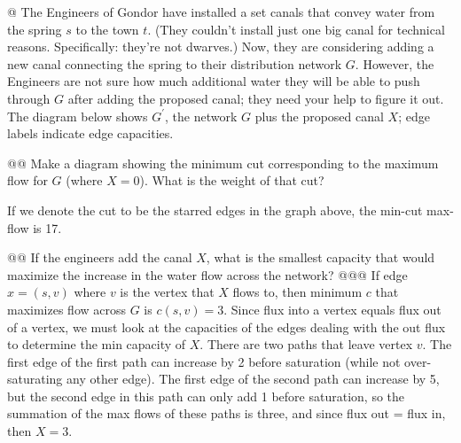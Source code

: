\documentclass[10pt]{article}\usepackage[]{graphicx}\usepackage[]{xcolor}
\makeatletter
\newenvironment{kframe}{%
 \def\at@end@of@kframe{}%
 \ifinner\ifhmode%
  \def\at@end@of@kframe{\end{minipage}}%
  \begin{minipage}{\columnwidth}%
 \fi\fi%
 \def\FrameCommand##1{\hskip\@totalleftmargin \hskip-\fboxsep
 \colorbox{shadecolor}{##1}\hskip-\fboxsep
     \hskip-\linewidth \hskip-\@totalleftmargin \hskip\columnwidth}%
 \MakeFramed {\advance\hsize-\width
   \@totalleftmargin\z@ \linewidth\hsize
   \@setminipage}}%
 {\par\unskip\endMakeFramed%
 \at@end@of@kframe}
\newenvironment{knitrout}{}{} %
\makeatother
\begin{document}
\begin{easylist}[enumerate]
    @ The Engineers of Gondor have installed a set canals that convey water from the spring $s$ to the town $t$. (They
    couldn't install just one big canal for technical reasons. Specifically: they're not dwarves.) Now, they are
    considering adding a new canal connecting the spring to their distribution network $G$. However, the Engineers are
    not sure how much additional water they will be able to push through $G$ after adding the proposed canal; they need
    your help to figure it out. The diagram below shows $G^\prime$, the network $G$ plus the proposed canal $X$; edge
    labels indicate edge capacities.

    @@ Make a diagram showing the minimum cut corresponding to the maximum flow for $G$ (where $X = 0$). What is the
    weight of that cut?

\begin{knitrout}
\color{fgcolor}\begin{kframe}


{\ttfamily\noindent\bfseries{}}

{\ttfamily\noindent\bfseries{}}\end{kframe}
\end{knitrout}

    If we denote the cut to be the starred edges in the graph above, the min-cut max-flow is 17.

    @@ If the engineers add the canal $X$, what is the smallest capacity that would maximize the increase in the water
    flow across the network?
    @@@ If edge $x = (s,v)$ where $v$ is the vertex that $X$ flows to, then minimum $c$ that maximizes flow across $G$
    is $c(s,v) = 3$.  Since flux into a vertex equals flux out of a vertex, we must look at the capacities of the edges
    dealing with the out flux to determine the min capacity of $X$.  There are two paths that leave vertex $v$.  The
    first edge of the first path can increase by 2 before saturation (while not over-saturating any other edge).  The
    first edge of the second path can increase by 5, but the second edge in this path can only add 1 before saturation,
    so the summation of the max flows of these paths is three, and since flux out = flux in, then $X = 3$.


\end{easylist}
\end{document}
